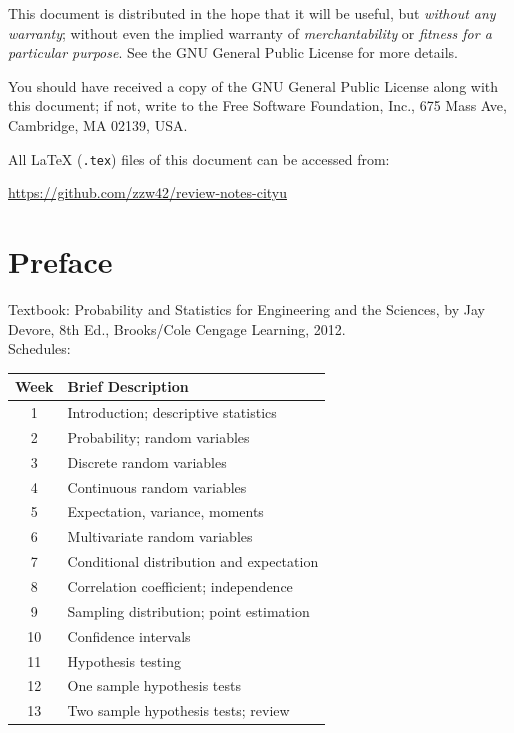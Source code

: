 \documentclass[UTF8,a4paper,openany]{book}
\theoremstyle{plain}
\theoremstyle{definition}
\begin{document}
This document is distributed in the hope that it will be useful, but \emph{without any warranty}; without even the implied warranty of \emph{merchantability} or \emph{fitness for a particular purpose}. See the GNU General Public License for more details.

You should have received a copy of the GNU General Public License along with this document; if not, write to the Free Software Foundation, Inc., 675 Mass Ave, Cambridge, MA 02139, USA.

All \LaTeX{} (\texttt{.tex}) files of this document can be accessed from:

\url{https://github.com/zzw42/review-notes-cityu}

\chapter*{Preface}
\textsf{
Textbook: Probability and Statistics for Engineering and the Sciences, by Jay Devore, 8th Ed., Brooks/Cole Cengage Learning, 2012. }
\\

Schedules:

\begin{center}
\begin{tabular}{cl}
\hline\hline
Week & Brief Description \\
\hline
1 & Introduction; descriptive statistics \\
2 & Probability; random variables \\
3 & Discrete random variables \\
4 & Continuous random variables \\
5 & Expectation, variance, moments \\
6 & Multivariate random variables \\
7 & Conditional distribution and expectation \\
8 & Correlation coefficient; independence \\
9 & Sampling distribution; point estimation \\
10 & Confidence intervals  \\
11 & Hypothesis testing \\
12 & One sample hypothesis tests \\
13 & Two sample hypothesis tests; review \\
\hline\hline
\end{tabular}
\end{center}


\tableofcontents
\listoffigures


\mainmatter










\end{document}
